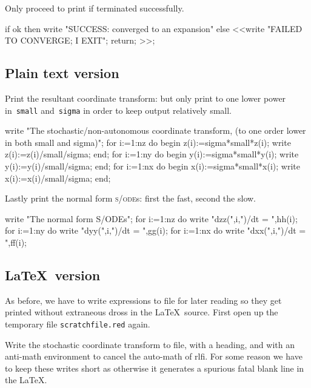 \documentclass[11pt,a5paper]{article}
\def\sde{\textsc{s/ode}}
\begin{document}
Only proceed to print if terminated successfully.
\begin{reduce}
if ok 
  then write "SUCCESS: converged to an expansion"
  else <<write "FAILED TO CONVERGE; I EXIT";
    return; >>;
\end{reduce}


\subsection{Plain text version}

Print the resultant coordinate transform: but only print to one lower power in~\verb|small| and~\verb|sigma| in order to keep output relatively small.
\begin{reduce}
write "The stochastic/non-autonomous coordinate transform,
(to one order lower in both small and sigma)";
for i:=1:nz do begin z(i):=sigma*small*z(i); 
               write z(i):=z(i)/small/sigma; end;
for i:=1:ny do begin y(i):=sigma*small*y(i); 
               write y(i):=y(i)/small/sigma; end;
for i:=1:nx  do begin x(i):=sigma*small*x(i); 
               write x(i):=x(i)/small/sigma; end;
\end{reduce}

Lastly print the normal form \sde{}s: first the fast, second the slow.
\begin{reduce}
write "The normal form S/ODEs";
for i:=1:nz do write "dzz(",i,")/dt = ",hh(i);
for i:=1:ny do write "dyy(",i,")/dt = ",gg(i);
for i:=1:nx do write "dxx(",i,")/dt = ",ff(i);
\end{reduce}



\subsection{\LaTeX\ version}

As before, we have to write expressions to file for later reading so they get printed without extraneous dross in the \LaTeX\ source.
First open up the temporary file \verb|scratchfile.red| again.

Write the stochastic coordinate transform to file, with a heading, and with an anti-math environment to cancel the auto-math of rlfi.
For some reason we have to keep these writes short as otherwise it generates a spurious fatal blank line in the \LaTeX.
\end{document}
